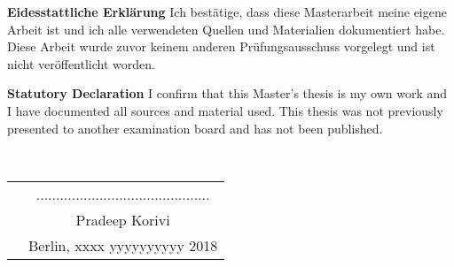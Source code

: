 \begin{titlepage}
\vspace*{4.0cm}

\noindent\textbf{Eidesstattliche Erkl{\"a}rung}\newline
Ich best{\"a}tige, dass diese Masterarbeit meine eigene Arbeit ist und ich alle verwendeten
Quellen und Materialien dokumentiert habe. Diese Arbeit wurde zuvor keinem
anderen Pr{\"u}fungsausschuss vorgelegt und ist nicht ver{\"o}ffentlicht worden.

\vspace*{4.0cm}


\noindent \textbf{Statutory Declaration}\newline
I confirm that this Master's thesis is my own work and I have documented all sources
and material used. This thesis was not previously presented to another examination
board and has not been published.

\vspace*{1cm}
~\\
\begin{flushright}

\begin{tabular}{lc}
      \vspace*{0.1cm}
       &  ............................................ \\
      \vspace*{0.1cm}
					      & \noindent \large{Pradeep Korivi}\\
	  \vspace*{0.1cm}
					      & \noindent \large{Berlin, xxxx yyyyyyyyyy 2018 }
\end{tabular}

\end{flushright}

\end{titlepage}
\sloppy

\titlepage


